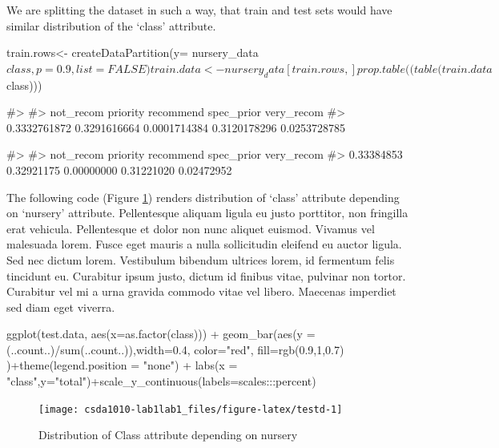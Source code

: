 We are splitting the dataset in such a way, that train and test sets
would have similar distribution of the `class' attribute.

\begin{Schunk}
\begin{Sinput}
train.rows<- createDataPartition(y= nursery_data$class, p=0.9, list = FALSE)
train.data<- nursery_data[train.rows,]
prop.table((table(train.data$class)))
\end{Sinput}
\begin{Soutput}
#> 
#>    not_recom     priority    recommend   spec_prior   very_recom 
#> 0.3332761872 0.3291616664 0.0001714384 0.3120178296 0.0253728785
\end{Soutput}
\end{Schunk}

\begin{Schunk}
\begin{Soutput}
#> 
#>  not_recom   priority  recommend spec_prior very_recom 
#> 0.33384853 0.32921175 0.00000000 0.31221020 0.02472952
\end{Soutput}
\end{Schunk}

The following code (Figure \ref{fig:testd}) renders distribution of
`class' attribute depending on `nursery' attribute. Pellentesque aliquam
ligula eu justo porttitor, non fringilla erat vehicula. Pellentesque et
dolor non nunc aliquet euismod. Vivamus vel malesuada lorem. Fusce eget
mauris a nulla sollicitudin eleifend eu auctor ligula. Sed nec dictum
lorem. Vestibulum bibendum ultrices lorem, id fermentum felis tincidunt
eu. Curabitur ipsum justo, dictum id finibus vitae, pulvinar non tortor.
Curabitur vel mi a urna gravida commodo vitae vel libero. Maecenas
imperdiet sed diam eget viverra.

\begin{Schunk}
\begin{Sinput}
ggplot(test.data, aes(x=as.factor(class))) + 
  geom_bar(aes(y = (..count..)/sum(..count..)),width=0.4,
  color="red", fill=rgb(0.9,1,0.7) )+theme(legend.position = "none") + 
  labs(x = "class",y="total")+scale_y_continuous(labels=scales:::percent)
\end{Sinput}
\begin{figure}

{\centering \texttt{[image: csda1010-lab1lab1\_files/figure-latex/testd-1]} 

}

\caption[Distribution of Class attribute depending on nursery]{Distribution of Class attribute depending on nursery}\label{fig:testd}
\end{figure}
\end{Schunk}

